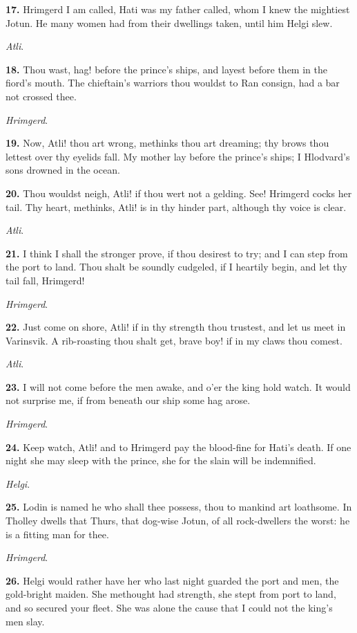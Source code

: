 \textbf{17.} Hrimgerd I am called, Hati was my father called, whom I knew the
mightiest Jotun. He many women had from their dwellings taken, until
him Helgi slew.

\emph{Atli}.

\textbf{18.} Thou wast, hag! before the prince's ships, and layest before
them in the fiord's mouth. The chieftain's warriors thou wouldst to
Ran consign, had a bar not crossed thee.

\emph{Hrimgerd}.

\textbf{19.} Now, Atli! thou art wrong, methinks thou art dreaming; thy brows
thou lettest over thy eyelids fall. My mother lay before the prince's
ships; I Hlodvard's sons drowned in the ocean.

\textbf{20.} Thou wouldst neigh, Atli! if thou wert not a gelding. See!
Hrimgerd cocks her tail. Thy heart, methinks, Atli! is in thy hinder
part, although thy voice is clear.

\emph{Atli}.

\textbf{21.} I think I shall the stronger prove, if thou desirest to try;
and I can step from the port to land. Thou shalt be soundly cudgeled,
if I heartily begin, and let thy tail fall, Hrimgerd!

\emph{Hrimgerd}.

\textbf{22.} Just come on shore, Atli! if in thy strength thou trustest, and
let us meet in Varinsvik. A rib-roasting thou shalt get, brave boy! if
in my claws thou comest.

\emph{Atli}.

\textbf{23.} I will not come before the men awake, and o'er the king hold
watch. It would not surprise me, if from beneath our ship some hag
arose.

\emph{Hrimgerd}.

\textbf{24.} Keep watch, Atli! and to Hrimgerd pay the blood-fine for Hati's
death. If one night she may sleep with the prince, she for the slain
will be indemnified.

\emph{Helgi}.

\textbf{25.} Lodin is named he who shall thee possess, thou to mankind art
loathsome. In Tholley dwells that Thurs, that dog-wise Jotun, of all
rock-dwellers the worst: he is a fitting man for thee.

\emph{Hrimgerd}.

\textbf{26.} Helgi would rather have her who last night guarded the port and
men, the gold-bright maiden. She methought had strength, she stept
from port to land, and so secured your fleet. She was alone the cause
that I could not the king's men slay.

